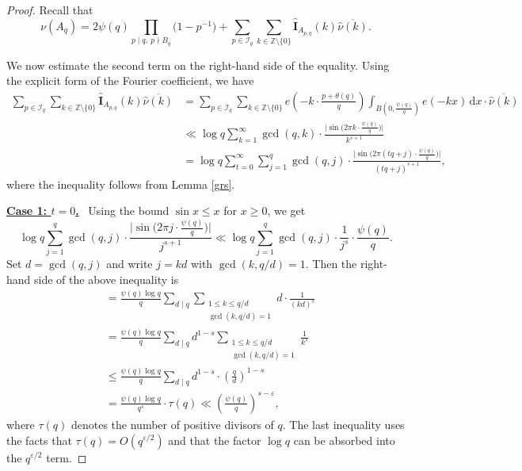 \documentclass[12pt,a4paper,twoside]{article}
\begin{document}
\begin{proof}
Recall that
\[
\nu(A_q)=2\psi(q) \prod_{ {p\mid q,~p\nmid B_q}} \bigl(1 - p^{-1}\bigr)+\sum_{p\in\mathcal{I}_q}\sum_{k\in\mathbb{Z}\setminus\{0\}}\widehat{\mathbf{I}}_{A_{p,q}}(k)\overline{\widehat{\nu}(k)}.
\]

We now estimate the second term on the right-hand side of the equality. Using the explicit form of the Fourier coefficient, we have
\begin{align*}
\sum_{p\in\mathcal{I}_q}\sum_{k\in\mathbb{Z}\setminus\{0\}}\widehat{\mathbf{I}}_{A_{p,q}}(k)\overline{\widehat{\nu}(k)}
&= \sum_{p\in\mathcal{I}_q}\sum_{k\in\mathbb{Z}\setminus\{0\}} e\!\left(-k \cdot \frac{p+\theta(q)}{q}\right) \int_{B(0,\frac{\psi(q)}{q})} e(-kx)\,\mathrm{d}x \cdot \overline{\widehat{\nu}(k)} \\
&\ll \log q \sum_{k=1}^\infty \gcd(q,k) \cdot \frac{\bigl| \sin\bigl(2\pi k \cdot \frac{\psi(q)}{q}\bigr) \bigr|}{k^{s+1}} \\
&= \log q \sum_{t=0}^{\infty}\sum_{j=1}^{q} \gcd(q,j) \cdot  \frac{\bigl| \sin\bigl(2\pi (tq+j) \cdot \frac{\psi(q)}{q}\bigr) \bigr|}{(tq+j)^{s+1}},
\end{align*}
where the inequality follows from Lemma \ref{grs}. %
\medskip

\underline{\textbf{Case 1: $t = 0$.}}~  Using the bound $\sin x \le x$ for $x \ge 0$, we get
\[
\log q \sum_{j=1}^{q} \gcd(q,j) \cdot \frac{\bigl| \sin\bigl(2\pi j \cdot \frac{\psi(q)}{q}\bigr) \bigr|}{j^{s+1}}
\ll \log q \sum_{j=1}^{q} \gcd(q,j) \cdot \frac{1}{j^{s}} \cdot \frac{\psi(q)}{q}.
\]
Set $d = \gcd(q,j)$ and write $j = kd$ with $\gcd(k, q/d) = 1$. Then the right-hand side of the above inequality is
\[
\begin{aligned}
&=\frac{\psi(q)\log q}{q} \sum_{d\mid q} \sum_{\substack{1\le k \le q/d \\ \gcd(k, q/d)=1}} d \cdot \frac{1}{(kd)^{s}} \\
&= \frac{\psi(q)\log q}{q} \sum_{d\mid q} d^{1-s} \sum_{\substack{1\le k \le q/d \\ \gcd(k, q/d)=1}} \frac{1}{k^{s}} \\
&\le \frac{\psi(q)\log q}{q} \sum_{d\mid q} d^{1-s} \cdot \left(\frac{q}{d}\right)^{1-s} \\
&= \frac{\psi(q)\log q}{q^{s}} \cdot \tau(q)\ll \left(\frac{\psi(q)}{q}\right)^{s-\varepsilon},
\end{aligned}
\]
where $\tau(q)$ denotes the number of positive divisors of $q$. The last inequality uses the facts that $\tau(q) = O(q^{\varepsilon/2})$ and that the factor $\log q$ can be absorbed into the $q^{\varepsilon/2}$ term.
\medskip


\end{proof}
\end{document}
